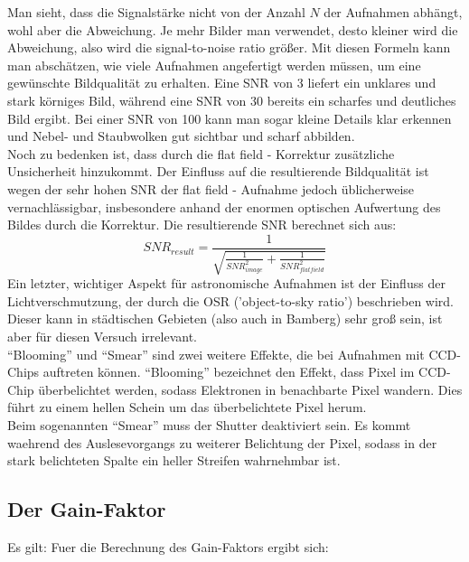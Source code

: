 Man sieht, dass die Signalstärke nicht von der Anzahl $N$ der Aufnahmen abhängt, wohl aber die Abweichung. Je mehr Bilder man verwendet, desto kleiner wird die Abweichung, also wird die signal-to-noise ratio größer. Mit diesen Formeln kann man abschätzen, wie viele Aufnahmen angefertigt werden müssen, um eine gewünschte Bildqualität zu erhalten. Eine SNR von 3 liefert ein unklares und stark körniges Bild, während eine SNR von 30 bereits ein scharfes und deutliches Bild ergibt. Bei einer SNR von 100 kann man sogar kleine Details klar erkennen und Nebel- und Staubwolken gut sichtbar und scharf abbilden.
\\
Noch zu bedenken ist, dass durch die flat field - Korrektur zusätzliche Unsicherheit hinzukommt. Der Einfluss auf die resultierende Bildqualität ist wegen der sehr hohen SNR der flat field - Aufnahme jedoch üblicherweise vernachlässigbar, insbesondere anhand der enormen optischen Aufwertung des Bildes durch die Korrektur. Die resultierende SNR berechnet sich aus:
\begin{equation}
SNR_{result} = \frac{1}{\sqrt{\frac{1}{SNR_{image}^2} + \frac{1}{SNR_{flatfield}^2}}}
\end{equation}
Ein letzter, wichtiger Aspekt für astronomische Aufnahmen ist der Einfluss der Lichtverschmutzung, der durch die OSR ('object-to-sky ratio') beschrieben wird. Dieser kann in städtischen Gebieten (also auch in Bamberg) sehr groß sein, ist aber für diesen Versuch irrelevant.\\
\enquote{Blooming} und \enquote{Smear} sind zwei weitere Effekte, die bei Aufnahmen mit CCD-Chips auftreten können. 
\enquote{Blooming} bezeichnet den Effekt, dass Pixel im CCD-Chip überbelichtet werden, sodass Elektronen in benachbarte Pixel wandern. Dies führt zu einem hellen Schein um das überbelichtete Pixel herum. \\
Beim sogenannten \enquote{Smear} muss der Shutter deaktiviert sein. Es kommt waehrend des Auslesevorgangs zu weiterer Belichtung der Pixel, sodass in der stark belichteten Spalte ein heller Streifen wahrnehmbar ist. 


\subsection{Der Gain-Faktor}Es gilt: 
Fuer die Berechnung des Gain-Faktors ergibt sich: \

